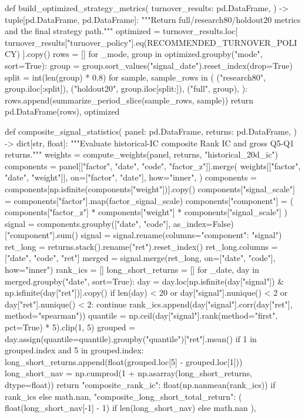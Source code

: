 \documentclass[UTF8,a4paper,fontset=fandol]{ctexart}
\begin{document}
\begin{ProjectCode}
def build_optimized_strategy_metrics(
    turnover_results: pd.DataFrame,
) -> tuple[pd.DataFrame, pd.DataFrame]:
    """Return full/research80/holdout20 metrics and the final strategy path."""
    optimized = turnover_results.loc[
        turnover_results["turnover_policy"].eq(RECOMMENDED_TURNOVER_POLICY)
    ].copy()
    rows = []
    for _mode, group in optimized.groupby("mode", sort=True):
        group = group.sort_values("signal_date").reset_index(drop=True)
        split = int(len(group) * 0.8)
        for sample, sample_rows in (
            ("research80", group.iloc[:split]),
            ("holdout20", group.iloc[split:]),
            ("full", group),
        ):
            rows.append(summarize_period_slice(sample_rows, sample))
    return pd.DataFrame(rows), optimized


def composite_signal_statistics(
    panel: pd.DataFrame,
    returns: pd.DataFrame,
) -> dict[str, float]:
    """Evaluate historical-IC composite Rank IC and gross Q5-Q1 returns."""
    weights = compute_weights(panel, returns, "historical_20d_ic")
    components = panel[["factor", "date", "code", "factor_z"]].merge(
        weights[["factor", "date", "weight"]],
        on=["factor", "date"],
        how="inner",
    )
    components = components[np.isfinite(components["weight"])].copy()
    components["signal_scale"] = components["factor"].map(factor_signal_scale)
    components["component"] = (
        components["factor_z"]
        * components["weight"]
        * components["signal_scale"]
    )
    signal = components.groupby(["date", "code"], as_index=False)["component"].sum()
    signal = signal.rename(columns={"component": "signal"})
    ret_long = returns.stack().rename("ret").reset_index()
    ret_long.columns = ["date", "code", "ret"]
    merged = signal.merge(ret_long, on=["date", "code"], how="inner")
    rank_ics = []
    long_short_returns = []
    for _date, day in merged.groupby("date", sort=True):
        day = day.loc[np.isfinite(day["signal"]) & np.isfinite(day["ret"])].copy()
        if len(day) < 20 or day["signal"].nunique() < 2 or day["ret"].nunique() < 2:
            continue
        rank_ics.append(day["signal"].corr(day["ret"], method="spearman"))
        quantile = np.ceil(day["signal"].rank(method="first", pct=True) * 5).clip(1, 5)
        grouped = day.assign(quantile=quantile).groupby("quantile")["ret"].mean()
        if 1 in grouped.index and 5 in grouped.index:
            long_short_returns.append(float(grouped.loc[5] - grouped.loc[1]))
    long_short_nav = np.cumprod(1 + np.asarray(long_short_returns, dtype=float))
    return {
        "composite_rank_ic": float(np.nanmean(rank_ics)) if rank_ics else math.nan,
        "composite_long_short_total_return": (
            float(long_short_nav[-1] - 1) if len(long_short_nav) else math.nan
        ),
    }



\end{ProjectCode}
\end{document}
